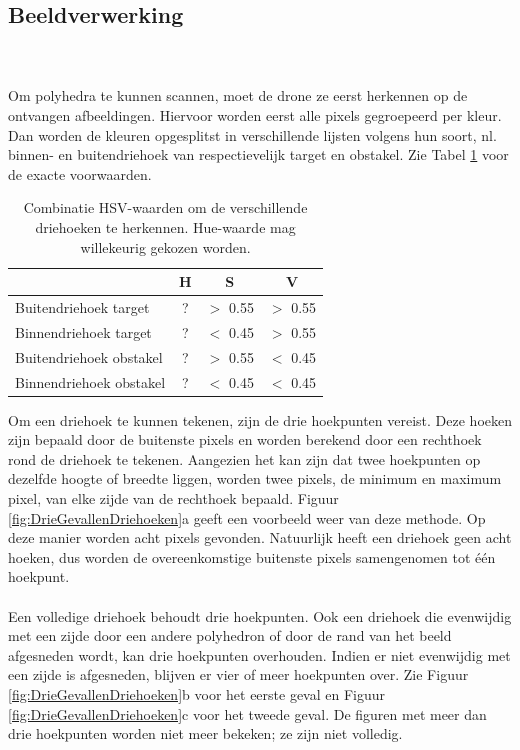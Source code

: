 \subsection{Beeldverwerking}
\\\\
\noindent
Om polyhedra te kunnen scannen, moet de drone ze eerst herkennen op de ontvangen afbeeldingen. 
Hiervoor worden eerst alle pixels gegroepeerd per kleur. Dan worden de kleuren opgesplitst in verschillende lijsten volgens hun soort, nl. binnen- en buitendriehoek van respectievelijk target en obstakel. Zie Tabel \ref{table: HSVwaarden} voor de exacte voorwaarden.
\begin{table}[H]
	\centering
\begin{tabular}{ l | c | c | c }
	 & H & S & V\\\hline
	Buitendriehoek target & ? & \(>\) 0.55 & \(>\) 0.55 \\
	Binnendriehoek target & ? & \(<\) 0.45 & \(>\) 0.55 \\
	Buitendriehoek obstakel & ? & \(>\) 0.55 & \(<\) 0.45 \\
	Binnendriehoek obstakel & ? & \(<\) 0.45 & \(<\) 0.45\\
\end{tabular}
\caption{\label{table: HSVwaarden}Combinatie HSV-waarden om de verschillende driehoeken te herkennen. Hue-waarde mag willekeurig gekozen worden.}
\end{table}
\noindent Om een driehoek te kunnen tekenen, zijn de drie hoekpunten vereist. Deze hoeken zijn bepaald door de buitenste pixels en worden berekend door een rechthoek rond de driehoek te tekenen. Aangezien het kan zijn dat twee hoekpunten op dezelfde hoogte of breedte liggen, worden twee pixels, de minimum en maximum pixel, van elke zijde van de rechthoek bepaald. Figuur \ref{fig:DrieGevallenDriehoeken}a geeft een voorbeeld weer van deze methode. Op deze manier worden acht pixels gevonden. Natuurlijk heeft een driehoek geen acht hoeken, dus worden de overeenkomstige buitenste pixels samengenomen tot één hoekpunt. 
\\\\
Een volledige driehoek behoudt drie hoekpunten. Ook een driehoek die evenwijdig met een zijde door een andere polyhedron of door de rand van het beeld afgesneden wordt, kan drie hoekpunten overhouden. Indien er niet evenwijdig met een zijde is afgesneden, blijven er vier of meer hoekpunten over. Zie Figuur \ref{fig:DrieGevallenDriehoeken}b voor het eerste geval en Figuur \ref{fig:DrieGevallenDriehoeken}c voor het tweede geval. De figuren met meer dan drie hoekpunten worden niet meer bekeken; ze zijn niet volledig.
